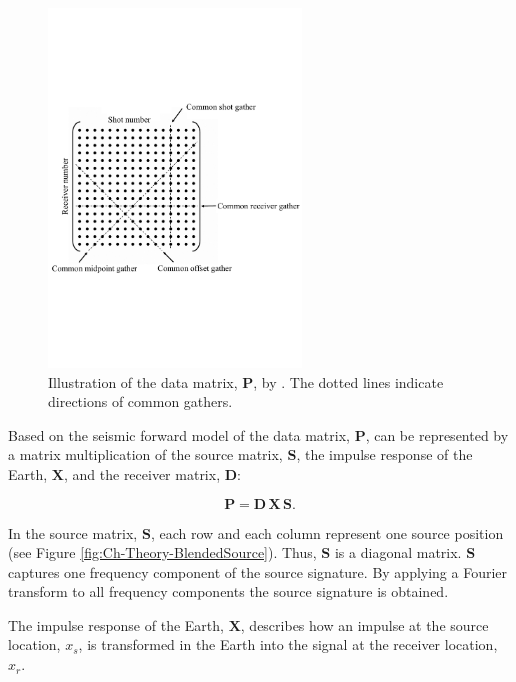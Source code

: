 \begin{figure}
    \centering
	\includegraphics[width = 0.6\textwidth]{Plots/Mahdad-Data-Matrix-edited}
	\caption{Illustration of the data matrix, $\mathbf{P}$, by \cite{Mahdad-Deblending-Method}. The dotted lines indicate directions of common gathers.}
	\label{fig:Ch-Theory-DataMatrixMahdad}
\end{figure}

Based on the seismic forward model of \citet{Berkhout1982} the data matrix, $\mathbf{P}$, can be represented by a matrix multiplication of the source matrix, $\mathbf{S}$, the impulse response of the Earth, $\mathbf{X}$, and the receiver matrix, $\mathbf{D}$:

\begin{equation}
	\mathbf{P} = \mathbf{D \, X \, S}.
	\label{eq:Ch-Theory-DataRepresentation}
\end{equation}

In the source matrix, $\mathbf{S}$, each row and each column represent one source position (see Figure \ref{fig:Ch-Theory-BlendedSource}). Thus, $\mathbf{S}$ is a diagonal matrix. $\mathbf{S}$ captures one frequency component of the source signature. By applying a Fourier transform to all frequency components the source signature is obtained.

 The impulse response of the Earth, $\mathbf{X}$, describes how an impulse at the source location, $x_s$, is transformed in the Earth into the signal at the receiver location, $x_r$.

